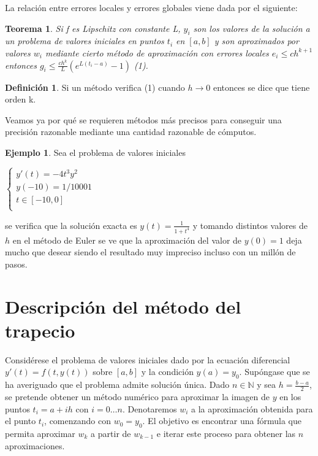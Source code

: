 \documentclass{article}
\theoremstyle{theorem-style}  %
\newtheorem{theorem}{Teorema}[section]  %
\theoremstyle{definition}
\newtheorem{definition}{Definición}[section]
\theoremstyle{example-style}
\newtheorem{example}{Ejemplo}[section]
\begin{document}
La relación entre errores locales y errores globales viene dada por el siguiente:

\begin{theorem}
Si f es Lipschitz con constante L, $y_i$ son los valores de la solución a un problema de valores iniciales en puntos $t_i$ en $[a,b]$ y son aproximados por valores $w_i$ mediante cierto método de aproximación con errores locales $e_i \leq c h^{k+1}$ entonces $g_i \le \frac{c h^k}{L} (e^{L(t_i-a)}-1)$ (1).
\end{theorem}

\begin{definition} Si un método verifica (1) cuando $h \to 0$ entonces se dice que tiene orden k.
\end{definition}

Veamos ya por qué se requieren métodos más precisos para conseguir una precisión razonable mediante una cantidad razonable de cómputos.

\begin{example} Sea el problema de valores iniciales
\begin{center}
$\begin{cases}
y'(t) = -4 t^3 y^2 \\
y(-10) = 1/10001 \\
t \in [-10,0] \\
\end{cases}$
\end{center}
se verifica que la solución exacta es $y(t)=\frac{1}{1+t^4}$ y tomando distintos valores de $h$ en el método de Euler se ve que la aproximación del valor de $y(0)=1$ deja mucho que desear siendo el resultado muy impreciso incluso con un millón de pasos. 
\end{example}


\section{Descripción del método del trapecio}

	Considérese el problema de valores iniciales dado por la ecuación diferencial $y'(t) = f(t,y(t))$ sobre $[a,b]$ y la condición $y(a) = y_0$. Supóngase que se ha averiguado que el problema admite solución única. Dado $n \in \mathbb{N}$ y sea $h = \frac{b-a}{2}$, se pretende obtener un método numérico para aproximar la imagen de $y$ en los puntos $t_i = a + ih$ con $i = 0 \ldots n$. Denotaremos $w_i$ a la aproximación obtenida para el punto $t_i$, comenzando con $w_0 = y_0$. El objetivo es encontrar una fórmula que permita aproximar $w_k$ a partir de $w_{k-1}$ e iterar este proceso para obtener las $n$ aproximaciones.
	
\end{document}
